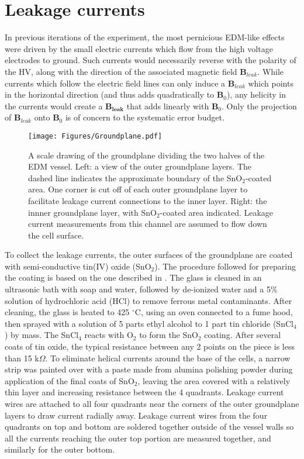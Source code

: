 \documentclass [10pt, twoside] {uwthesis}[2012/04/02]
\begin{document}
\section{Leakage currents} \label{Leakage}
In previous iterations of the experiment, the most pernicious EDM-like effects were driven by the small electric currents which flow from the high voltage electrodes to ground. Such currents would necessarily reverse with the polarity of the HV, along with the direction of the associated magnetic field $\mathbf{B}_{leak}$. While currents which follow the electric field lines can only induce a $\mathbf{B}_{leak}$ which points in the horizontal direction (and thus adds quadratically to $\mathbf{B}_0$), any helicity in the currents would create a $\mathbf{B_{leak}}$ that adds linearly with $\mathbf{B}_0$. Only the projection of $\mathbf{B}_{leak}$ onto $\mathbf{B}_0$ is of concern to the systematic error budget. 

\begin{figure}
\begin{center}
\texttt{[image: Figures/Groundplane.pdf]}
\end{center}
\caption[Scale drawing of fused silica groundplane]%
{\narrower A scale drawing of the groundplane dividing the two halves of the EDM vessel. Left: a view of the outer groundplane layers. The dashed line indicates the approximate boundary of the SnO$_2$-coated area. One corner is cut off of each outer groundplane layer to facilitate leakage current connections to the inner layer. Right: the innner groundplane layer, with SnO$_2$-coated area indicated. Leakage current measurements from this channel are assumed to flow down the cell surface.}
\label{GroundplaneDiagram}
\end{figure}

To collect the leakage currents, the outer surfaces of the groundplane are coated with semi-conductive tin(IV) oxide (SnO$_2$). The procedure followed for preparing the coating is based on the one described in \cite{Griffith}. The glass is cleaned in an ultrasonic bath with soap and water, followed by de-ionized water and a 5\% solution of hydrochloric acid (HCl) to remove ferrous metal contaminants. After cleaning, the glass is heated to 425 $^{\circ}$C, using an oven connected to a fume hood, then sprayed with a solution of 5 parts ethyl alcohol to 1 part tin chloride (SnCl$_4$) by mass. The SnCl$_4$ reacts with O$_2$ to form the SnO$_2$ coating. After several coats of tin oxide, the typical resistance between any 2 points on the piece is less than 15 k$\Omega$. To eliminate helical currents around the base of the cells, a narrow strip was painted over with a paste made from alumina polishing powder during application of the final coats of SnO$_2$, leaving the area covered with a relatively thin layer and increasing resistance between the 4 quadrants. Leakage current wires are attached to all four quadrants near the corners of the outer groundplane layers to draw current radially away. Leakage current wires from the four quadrants on top and bottom are soldered together outside of the vessel walls so all the currents reaching the outer top portion are measured together, and similarly for the outer bottom. 
\end{document}
